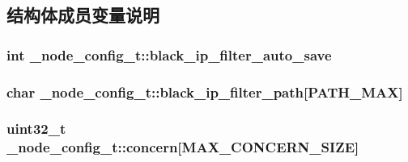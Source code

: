 \subsection{结构体成员变量说明}
\hypertarget{a00034_a6a0ac103d85cdfe46fe7cdfaca1e75f8_a6a0ac103d85cdfe46fe7cdfaca1e75f8}{}
\subsubsection[{black\+\_\+ip\+\_\+filter\+\_\+auto\+\_\+save}]{\setlength{\rightskip}{0pt plus 5cm}int \+\_\+node\+\_\+config\+\_\+t\+::black\+\_\+ip\+\_\+filter\+\_\+auto\+\_\+save}\label{a00034_a6a0ac103d85cdfe46fe7cdfaca1e75f8_a6a0ac103d85cdfe46fe7cdfaca1e75f8}
\hypertarget{a00034_ac7f8511fcc53cf30f9bc3e3f0e79606c_ac7f8511fcc53cf30f9bc3e3f0e79606c}{}
\subsubsection[{black\+\_\+ip\+\_\+filter\+\_\+path}]{\setlength{\rightskip}{0pt plus 5cm}char \+\_\+node\+\_\+config\+\_\+t\+::black\+\_\+ip\+\_\+filter\+\_\+path\mbox{[}P\+A\+T\+H\+\_\+\+M\+A\+X\mbox{]}}\label{a00034_ac7f8511fcc53cf30f9bc3e3f0e79606c_ac7f8511fcc53cf30f9bc3e3f0e79606c}
\hypertarget{a00034_a8103c5acc92e5950e449fcb9b69b4d9e_a8103c5acc92e5950e449fcb9b69b4d9e}{}
\subsubsection[{concern}]{\setlength{\rightskip}{0pt plus 5cm}uint32\+\_\+t \+\_\+node\+\_\+config\+\_\+t\+::concern\mbox{[}{\bf M\+A\+X\+\_\+\+C\+O\+N\+C\+E\+R\+N\+\_\+\+S\+I\+Z\+E}\mbox{]}}\label{a00034_a8103c5acc92e5950e449fcb9b69b4d9e_a8103c5acc92e5950e449fcb9b69b4d9e}
\hypertarget{a00034_acee10d2325f75b74a946dc9456b05a90_acee10d2325f75b74a946dc9456b05a90}{}
